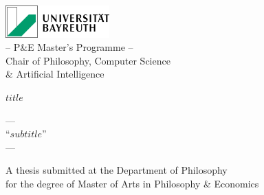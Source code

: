 \begin{titlepage}
  \begin{center}
    \includegraphics[width=4cm]{latex/uni-bayreuth-logo.png}\\[0.5cm]
    {\large -- P\&E Master's Programme --}\\
    {\small Chair of Philosophy, Computer Science}\\
    {\small \& Artificial Intelligence}\\[2cm]
  \end{center}

  \begin{center}
    \huge\textbf{$title$}\\[1cm]
    \begin{minipage}{0.8\textwidth}
      \begin{center}
        {\large ---}\\[0.3cm]
        {\large ``$subtitle$''}\\[0.3cm]
        {\large ---}\\[1.5cm]
      \end{center}
    \end{minipage}
  \end{center}
  
  \begin{center}
    \large A thesis submitted at the Department of Philosophy\\[0.3cm]
    for the degree of Master of Arts in Philosophy \& Economics\\[2cm]
  \end{center}
  

\end{titlepage}
